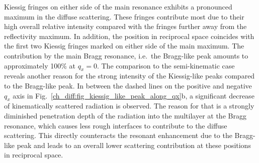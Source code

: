 Kiessig fringes on either side of the main resonance exhibits a pronounced maximum in the diffuse scattering. These fringes contribute most due to their high overall relative 
intensity compared with the fringes further away from the reflectivity maximum. In addition, the position in reciprocal space coincides with the first two Kiessig fringes marked on either side of the main maximum. The contribution by the main Bragg resonance, i.e.~the Bragg-like peak amounts to approximately 100\% at $q_x=0$. The comparison to the semi-kinematic case reveals another reason for the strong intensity of the Kiessig-like peaks compared to the Bragg-like peak. In between the dashed lines on the positive and negative $q_x$ axis in Fig.~\ref{ch_diff:fig_kiessig_like_peak_along_qx}b, a significant decrease of kinematically scattered radiation is observed. The reason for that is a strongly diminished penetration depth of the radiation into the multilayer at the Bragg resonance, which causes less rough interfaces to contribute to the diffuse scattering. This directly counteracts the resonant enhancement due to the Bragg-like peak and leads to an overall lower scattering contribution at these positions in reciprocal space.

